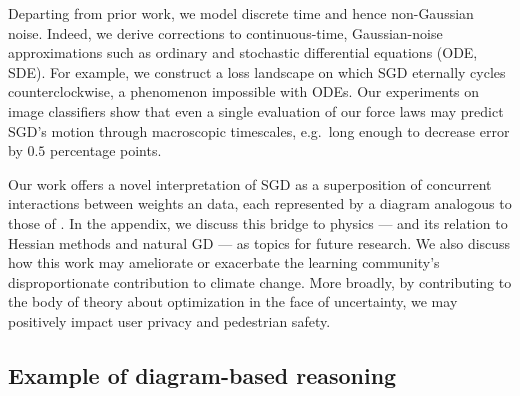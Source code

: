 \documentclass{article}
\theoremstyle{plain}
\theoremstyle{definition}
\newcommand{\wasq}[1]{\left[#1\right]}
\newcommand{\expc}{\mathbb{E}}
\begin{document}


    Departing from prior work, we model discrete time and hence non-Gaussian
    noise.  Indeed, we derive corrections to continuous-time, Gaussian-noise
    approximations such as ordinary and stochastic differential equations (ODE,
    SDE).
    For example, we construct a loss landscape on which SGD eternally cycles
    counterclockwise, a phenomenon impossible with ODEs. 
    Our experiments on image classifiers show that even a single evaluation of
    our force laws may predict SGD's motion through macroscopic timescales,
    e.g.\ long enough to decrease error by $0.5$ percentage points.



    Our work offers a novel interpretation of SGD as a superposition of
    concurrent interactions between weights an data, each represented by a
    diagram analogous to those of \cite{fe49, pe71}.
    In the appendix, we discuss this bridge to physics --- and its relation
    to Hessian methods and natural GD --- as topics for future research.
    We also discuss how this work may ameliorate or exacerbate the learning
    community's disproportionate contribution to climate change.  More broadly,
    by contributing to the body of theory about optimization in the face of
    uncertainty, we may positively impact user privacy and pedestrian safety.

    \subsection{Example of diagram-based reasoning}

        \newcommand{\nb} { \nabla }
        \newcommand{\lx} { l_x(\theta) }
        \newcommand{\teq} { \triangleq }
        \newcommand{\ex}[1] { \expc_x \wasq{#1} }
\end{document}
